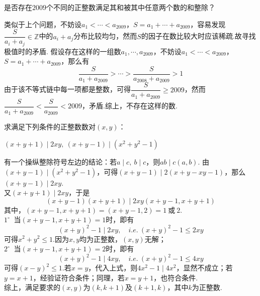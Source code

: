 \documentclass[cn,hazy,black,10pt,normal]{elegantnote}
\newenvironment{guess}{
  \color{guess}}{\newline \color{black}}
\newcommand{\cor}{~\textit{或}~}
\newcommand{\buzhou}[1]{$#1^{\circ} \ $}
\begin{document}
\begin{cproblem} %
	是否存在$2009$个不同的正整数满足其和被其中任意两个数的和整除？
\end{cproblem}
\begin{solution}
	\begin{guess}
		类似于上个问题，不妨设$a_1 < \cdots < a_{2009}$，$S=a_1+ \cdots + a_{2009}$，容易发现$\dfrac{S}{a_i+a_j} \in \mathbb{Z}$中的$a_i+a_j$分布比较均匀，然而$S$的因子在数比较大时应该稀疏.故寻找极值时的矛盾.
	\end{guess}
	假设存在这样的一组数$a_1, \cdots ,a_{2009}$，不妨设$a_1 < \cdots < a_{2009}$，$S=a_1+ \cdots + a_{2009}$，那么有$$\frac{S}{a_1+a_{2009}} > \cdots > \frac{S}{a_{2008}+a_{2009}} >1$$
	由于该不等式链中每一项都是整数，可得$\dfrac{S}{a_1+a_{2009}} \geq 2009$，然而$\dfrac{S}{a_1+a_{2009}} < \dfrac{S}{a_{2009}} <2009$，矛盾.综上，不存在这样的数.
\end{solution}

\begin{cproblem} %
	求满足下列条件的正整数数对$(x,y)$：
	\begin{center}
		$(x+y+1) \mid 2xy,~(x+y-1) \mid (x^2+y^2-1)$
	\end{center}
\end{cproblem}
\begin{solution}
	\begin{guess}
		有一个操纵整除符号左边的结论：若$a \mid c,~b \mid c$，则$ab \mid c(a,b)$.
	\end{guess}
	由$(x+y-1) \mid (x^2+y^2-1)$，可得$(x+y-1) \mid 2(x+y-xy-1)$，那么$(x+y-1) \mid 2xy$. \\
	又$(x+y+1) \mid 2xy$，于是$$(x+y-1)(x+y+1) \mid 2xy (x+y-1,x+y+1)$$
	其中，$(x+y-1,x+y+1)=(x+y-1,2)=1\cor 2$. \\
	\buzhou{1} 当$(x+y-1,x+y+1)=1$时，即有$$(x+y)^2-1 \mid 2xy,\quad i.e.~(x+y)^2-1 \leq 2xy$$可得$x^2+y^2 \leq 1$.因为$x,y$均为正整数，$(x,y)$无解； \\
	\buzhou{2} 当$(x+y-1,x+y+1)=2$时，即有$$(x+y)^2-1 \mid 4xy,\quad i.e.~(x+y)^2-1 \leq 4xy$$可得$(x-y)^2 \leq 1$.若$x=y$，代入上式，则$4x^2-1 \mid 4x^2$，显然不成立；若$y=x+1$，经验证符合条件；同理，若$x=y+1$，也符合条件. \\
	综上，满足要求的$(x,y)$为$(k,k+1)$及$(k+1,k)$，其中$k$为正整数.
\end{solution}
\end{document}
